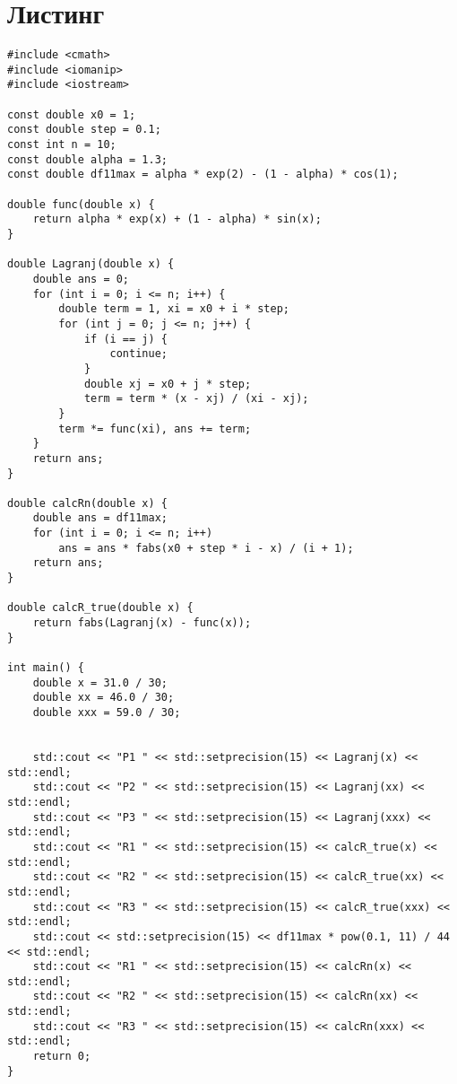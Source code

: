 \documentclass[10pt]{scrartcl}
\makeatletter
\newcommand{\verbatimfont}[1]{\renewcommand{\verbatim@font}{\ttfamily#1}}
\makeatother
\begin{document}
\section*{Листинг}
\verbatimfont{\small}
\begin{verbatim}
#include <cmath>
#include <iomanip>
#include <iostream>

const double x0 = 1;
const double step = 0.1;
const int n = 10;
const double alpha = 1.3;
const double df11max = alpha * exp(2) - (1 - alpha) * cos(1);

double func(double x) {
    return alpha * exp(x) + (1 - alpha) * sin(x);
}

double Lagranj(double x) {
    double ans = 0;
    for (int i = 0; i <= n; i++) {
        double term = 1, xi = x0 + i * step;
        for (int j = 0; j <= n; j++) {
            if (i == j) {
                continue;
            }
            double xj = x0 + j * step;
            term = term * (x - xj) / (xi - xj);
        }
        term *= func(xi), ans += term;
    }
    return ans;
}

double calcRn(double x) {
    double ans = df11max;
    for (int i = 0; i <= n; i++)
        ans = ans * fabs(x0 + step * i - x) / (i + 1);
    return ans;
}

double calcR_true(double x) {
    return fabs(Lagranj(x) - func(x));
}

int main() {
    double x = 31.0 / 30;
    double xx = 46.0 / 30;
    double xxx = 59.0 / 30;


    std::cout << "P1 " << std::setprecision(15) << Lagranj(x) << std::endl;
    std::cout << "P2 " << std::setprecision(15) << Lagranj(xx) << std::endl;
    std::cout << "P3 " << std::setprecision(15) << Lagranj(xxx) << std::endl;
    std::cout << "R1 " << std::setprecision(15) << calcR_true(x) << std::endl;
    std::cout << "R2 " << std::setprecision(15) << calcR_true(xx) << std::endl;
    std::cout << "R3 " << std::setprecision(15) << calcR_true(xxx) << std::endl;
    std::cout << std::setprecision(15) << df11max * pow(0.1, 11) / 44 << std::endl;
    std::cout << "R1 " << std::setprecision(15) << calcRn(x) << std::endl;
    std::cout << "R2 " << std::setprecision(15) << calcRn(xx) << std::endl;
    std::cout << "R3 " << std::setprecision(15) << calcRn(xxx) << std::endl;
    return 0;
}
\end{verbatim}
\end{document}
